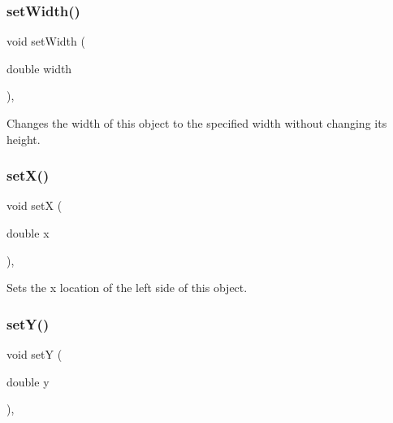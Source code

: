\subsubsection{\texorpdfstring{set\+Width()}{setWidth()}}
{\footnotesize\ttfamily void set\+Width (\begin{DoxyParamCaption}\item[{double}]{width }\end{DoxyParamCaption})\hspace{0.3cm}{\ttfamily [virtual]}, {\ttfamily [inherited]}}



Changes the width of this object to the specified width without changing its height. 

\mbox{\label{classsgl_1_1GObject_a9c18fcc579333bf9653d13ad2b372e39}} 
\subsubsection{\texorpdfstring{set\+X()}{setX()}}
{\footnotesize\ttfamily void setX (\begin{DoxyParamCaption}\item[{double}]{x }\end{DoxyParamCaption})\hspace{0.3cm}{\ttfamily [virtual]}, {\ttfamily [inherited]}}



Sets the x location of the left side of this object. 

\mbox{\label{classsgl_1_1GObject_a7d57e2a5c35d27feb58fd498a3cf82b9}} 
\subsubsection{\texorpdfstring{set\+Y()}{setY()}}
{\footnotesize\ttfamily void setY (\begin{DoxyParamCaption}\item[{double}]{y }\end{DoxyParamCaption})\hspace{0.3cm}{\ttfamily [virtual]}, {\ttfamily [inherited]}}



